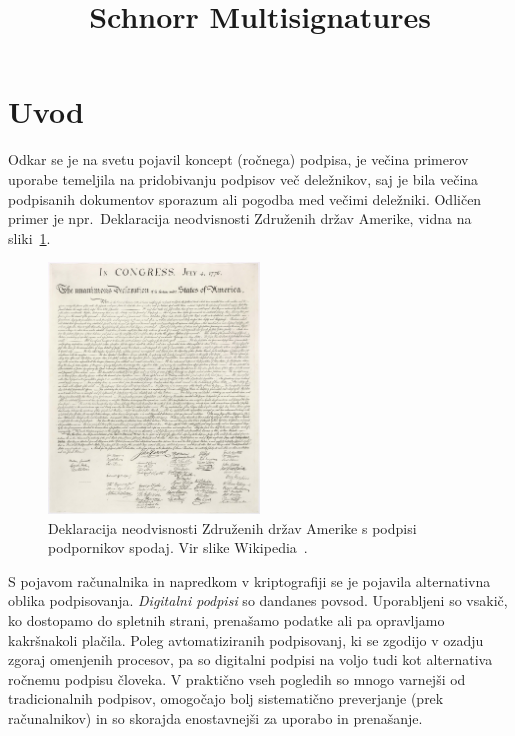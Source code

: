 \documentclass[isrm2, tisk]{fmfdelo}
\title{Schnorr Multisignatures}
\begin{document}
\section{Uvod}
Odkar se je na svetu pojavil koncept (ročnega) podpisa, je večina primerov uporabe temeljila na
pridobivanju podpisov več deležnikov, saj je bila večina podpisanih dokumentov sporazum ali pogodba
med večimi deležniki. Odličen primer je npr.\ Deklaracija neodvisnosti Združenih držav
Amerike, vidna na sliki~\ref{fig:declaration}. 

\begin{figure}[ht]
  \centering
  \includegraphics[width=0.5\textwidth]{images/declaration.jpg}
  \caption[Deklaracija neodvisnosti Združenih držav Amerike.]{Deklaracija neodvisnosti Združenih 
  držav Amerike s podpisi podpornikov spodaj. Vir slike Wikipedia~\cite{doi}.}
  \label{fig:declaration}
\end{figure}

S pojavom računalnika in napredkom v kriptografiji se je pojavila alternativna oblika podpisovanja.
\textit{Digitalni podpisi} so dandanes povsod. Uporabljeni so vsakič, ko dostopamo do spletnih
strani, prenašamo podatke ali pa opravljamo kakršnakoli plačila. Poleg avtomatiziranih podpisovanj,
ki se zgodijo v ozadju zgoraj omenjenih procesov, pa so digitalni podpisi na voljo tudi kot alternativa
ročnemu podpisu človeka. V praktično vseh pogledih so mnogo varnejši od tradicionalnih podpisov,
omogočajo bolj sistematično preverjanje (prek računalnikov) in so skorajda enostavnejši za uporabo
in prenašanje.
\end{document}
